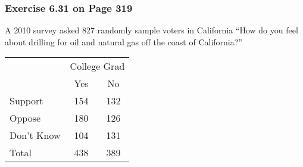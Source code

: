\documentclass[handout]{beamer}
\begin{document}
\begin{frame}[fragile]
\frametitle{Exercise 6.31 on Page 319}
A 2010 survey asked 827 randomly sample voters in California ``How do you feel about drilling for oil and natural gas off the coast of California?''

\begin{center}
\begin{tabular}{l|cc}
 & \multicolumn{2}{c}{College Grad} \\
 & Yes & No  \\
\hline
Support & 154 & 132  \\
Oppose & 180 & 126 \\
Don't Know & 104 & 131 \\
\hline
Total & 438 & 389 \\
\end{tabular}
\end{center}


\end{frame}
\end{document}
